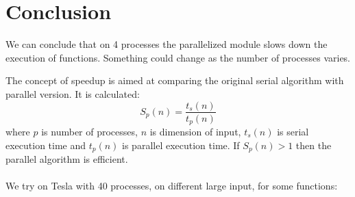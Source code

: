 \documentclass{article}
\begin{document}

\section{Conclusion}
We can conclude that on 4 processes the parallelized module slows down the execution of functions. 
Something could change as the number of processes varies. 

The concept of speedup is aimed at comparing the original serial algorithm with parallel version.
It is calculated:
\[S_p(n)=\frac{t_s(n)}{t_p(n)}\]
where $p$ is number of processes, $n$ is dimension of input, $t_s(n)$ is serial execution time and $t_p(n)$ is parallel execution time.
If $S_p(n) > 1$ then the parallel algorithm is efficient.
\\
\\
We try on Tesla with 40 processes, on different large input, for some functions:
\end{document}
